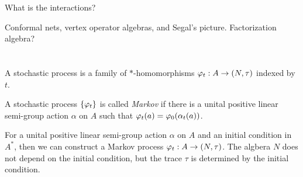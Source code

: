 \documentclass{../../large}
\begin{document}
What is the interactions?


Conformal nets, vertex operator algebras, and Segal's picture.
Factorization algebra?




\section{}

A stochastic process is a family of $*$-homomorphisms $\varphi_t:A\to(N,\tau)$ indexed by $t$.

A stochastic process $\{\varphi_t\}$ is called \emph{Markov} if there is a unital positive linear semi-group action $\alpha$ on $A$ such that $\varphi_t(a)=\varphi_0(\alpha_t(a))$.

For a unital positive linear semi-group action $\alpha$ on $A$ and an initial condition in $A^*$, then we can construct a Markov process $\varphi_t:A\to(N,\tau)$.
The algbera $N$ does not depend on the initial condition, but the trace $\tau$ is determined by the initial condition.
\end{document}
